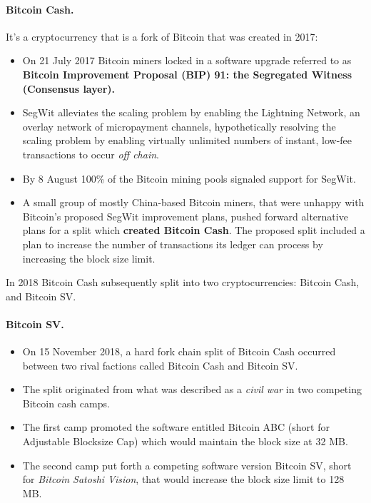 \paragraph{Bitcoin Cash.}

It's a cryptocurrency that is a fork of Bitcoin that was created in 2017:
\begin{itemize}
	\item On 21 July 2017 Bitcoin miners locked in a software upgrade referred to as \textbf{Bitcoin Improvement Proposal (BIP) 91: the Segregated Witness (Consensus layer).}
	\item SegWit alleviates the scaling problem by enabling the Lightning Network, an overlay network of micropayment channels, hypothetically resolving the scaling problem by enabling virtually unlimited numbers of instant, low-fee transactions to occur \textit{off chain}.
	\item By 8 August 100\% of the Bitcoin mining pools signaled support for SegWit.
	\item A small group of mostly China-based Bitcoin miners, that were unhappy with Bitcoin's proposed SegWit improvement plans, pushed forward alternative plans for a split which \textbf{created Bitcoin Cash}. The proposed split included a plan to increase the number of transactions its ledger can process by increasing the block size limit.
\end{itemize}

In 2018 Bitcoin Cash subsequently split into two cryptocurrencies: Bitcoin Cash, and Bitcoin SV.

\paragraph*{Bitcoin SV.}
\begin{itemize}
	\item On 15 November 2018, a hard fork chain split of Bitcoin Cash occurred between two rival factions called Bitcoin Cash and Bitcoin SV.
	\item The split originated from what was described as a \textit{civil war} in two competing Bitcoin cash camps.
	\item The first camp promoted the software entitled Bitcoin ABC (short for Adjustable Blocksize Cap) which would maintain the block size at 32 MB.
	\item The second camp put forth a competing software version Bitcoin SV, short for \emph{Bitcoin Satoshi Vision}, that would increase the block size limit to 128 MB.
\end{itemize}

